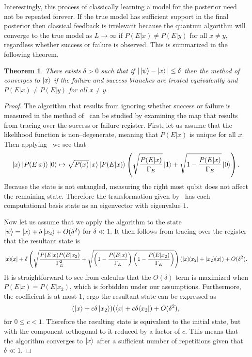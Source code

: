 \documentclass[aps,amsmath,onecolumn,amssymb,notitlepage]{revtex4-1}
\newtheorem{theorem}{Theorem}
\begin{document}
Interestingly, this process of classically learning a model for the posterior need not be repeated forever.  If the true model has sufficient support in the final posterior then classical feedback is irrelevant because the quantum algorithm will converge to the true model as $L\rightarrow \infty$ if $P(E|x) \ne P(E|y)$ for all $x\ne y$, regardless whether success or failure is observed.  This is summarized in the following theorem.
\begin{theorem}
There exists $\delta>0$ such that if $|\left|\psi\right\rangle - \left|x\right\rangle| \le \delta$ then the method of~ converges to $\left|x\right\rangle$ if the failure and success branches are treated equivalently and $P(E|x) \ne P(E|y)$ for all $x\ne y$.
\end{theorem}
\begin{proof}
The algorithm that results from ignoring whether success or failure is measured in the method of~ can be studied by examining the map that results from tracing over the success or failure register.
First, let us assume that the likelihood function is non--degenerate, meaning that $P(E|x)$ is unique for all $x$.  Then applying~ we see that
\begin{equation}
\left|x\right\rangle \left|P(E|x)\right\rangle\left|0\right\rangle\mapsto \sqrt{P(x)} \left|x\right\rangle \left|P(E|x)\right\rangle\left(\sqrt{\frac{P(E|x)}{\Gamma_E}}\left|1\right\rangle + \sqrt{1-\frac{P(E|x)}{\Gamma_E}}\left|0\right\rangle \right).
\end{equation}
Because the state is not entangled, measuring the right most qubit does not affect the remaining state.  Therefore the transformation given by~ has each computational basis state as an eigenvector with eigenvalue $1$.

Now let us assume that we apply the algorithm to the state $\left|\psi\right\rangle = \left|x\right\rangle +\delta \left|x_2\right\rangle + O(\delta^2)$ for $\delta\ll 1$.  It then follows from tracing over the register that the resultant state is
\begin{equation}
|x\rangle\!\langle x| + \delta\left(\sqrt{\frac{P(E|x)P(E|x_2)}{\Gamma_E^2}} + \sqrt{\left(1-\frac{P(E|x)}{\Gamma_E}\right)\left(1-\frac{P(E|x_2)}{\Gamma_E}\right)} \right)(|x\rangle\!\langle x_2|+|x_2\rangle\!\langle x|) + O(\delta^2).
\end{equation}
It is straightforward to see from calculus that the $O(\delta)$ term is maximized when $P(E|x)=P(E|x_2)$, which is forbidden under our assumptions.  Furthermore, the coefficient is at most $1$, ergo the resultant state can be expressed as
\begin{equation}
(\left|x\right\rangle + c\delta \left|x_2\right\rangle)(\langle x| + c\delta \langle x_2|) + O(\delta^2),
\end{equation}
for $0\le c<1$.  Therefore the resulting state is equivalent to the initial state, but with the component orthogonal to it reduced by a factor of $c$.  This means that the algorithm converges to $\left|x\right\rangle$ after a sufficient number of repetitions given that $\delta\ll 1$.


\end{proof}
\end{document}
